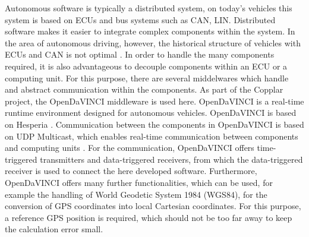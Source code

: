 Autonomous software is typically a distributed system, on today's vehicles this system is based on ECUs and bus systems such as CAN, LIN.
Distributed software makes it easier to integrate complex components within the system. In the area of autonomous driving, however,
the historical structure of vehicles with ECUs and CAN is not optimal \cite{Broy2006}. In order to handle the many components required,
it is also advantageous to decouple components within an ECU or a computing unit. For this purpose,
there are several middelwares which handle and abstract communication within the components. As part of the Copplar project, the OpenDaVINCI middleware is used here.
OpenDaVINCI is a real-time runtime environment designed for autonomous vehicles. OpenDaVINCI is based on Hesperia \cite{Berger2010}. 
Communication between the components in OpenDaVINCI is based on UDP Multicast, which enables real-time communication between components and computing units \cite{Kurose2013} .
For the communication, OpenDaVINCI offers time-triggered transmitters and data-triggered receivers, 
from which the data-triggered receiver is used to connect the here developed software. Furthermore, OpenDaVINCI offers many further functionalities,
which can be used, for example the handling of World Geodetic System 1984 (WGS84), for the conversion of GPS coordinates into local Cartesian coordinates.
For this purpose, a reference GPS position is required, which should not be too far away to keep the calculation error small.






